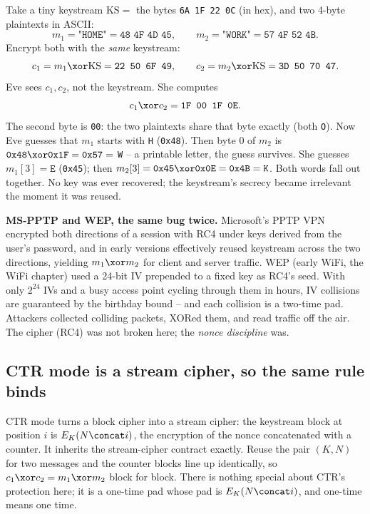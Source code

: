 \begin{example}
\label{ch38:ex-two-time}
Take a tiny keystream $\mathrm{KS} = $ the bytes \texttt{6A 1F 22 0C} (in hex), and two 4-byte plaintexts in ASCII:
\[
m_1 = \texttt{"HOME"}=\texttt{48 4F 4D 45}, \qquad m_2 = \texttt{"WORK"}=\texttt{57 4F 52 4B}.
\]
Encrypt both with the \emph{same} keystream:
\[
c_1 = m_1 \xor \mathrm{KS} = \texttt{22 50 6F 49}, \qquad
c_2 = m_2 \xor \mathrm{KS} = \texttt{3D 50 70 47}.
\]
Eve sees $c_1, c_2$, not the keystream. She computes
\[
c_1 \xor c_2 = \texttt{1F 00 1F 0E}.
\]
The second byte is \texttt{00}: the two plaintexts share that byte exactly (both \texttt{O}). Now Eve guesses that $m_1$ starts with \texttt{H} (\texttt{0x48}). Then byte 0 of $m_2$ is $\texttt{0x48} \xor \texttt{0x1F} = \texttt{0x57} = $ \texttt{W} -- a printable letter, the guess survives. She guesses $m_1[3]=\texttt{E}$ (\texttt{0x45}); then $m_2[3] = \texttt{0x45}\xor\texttt{0x0E}=\texttt{0x4B}=\texttt{K}$. Both words fall out together. No key was ever recovered; the keystream's secrecy became irrelevant the moment it was reused.
\end{example}

\begin{attackbox}
\textbf{MS-PPTP and WEP, the same bug twice.} Microsoft's PPTP VPN encrypted both directions of a session with RC4 under keys derived from the user's password, and in early versions effectively reused keystream across the two directions, yielding $m_1 \xor m_2$ for client and server traffic. WEP (early WiFi, the WiFi chapter) used a 24-bit IV prepended to a fixed key as RC4's seed. With only $2^{24}$ IVs and a busy access point cycling through them in hours, IV collisions are guaranteed by the birthday bound -- and each collision is a two-time pad. Attackers collected colliding packets, XORed them, and read traffic off the air. The cipher (RC4) was not broken here; the \emph{nonce discipline} was.
\end{attackbox}

\subsection{CTR mode is a stream cipher, so the same rule binds}
\label{ch38:ctr-nonce}

CTR mode turns a block cipher into a stream cipher: the keystream block at position $i$ is $E_K(N \concat i)$, the encryption of the nonce concatenated with a counter. It inherits the stream-cipher contract exactly. Reuse the pair $(K, N)$ for two messages and the counter blocks line up identically, so $c_1 \xor c_2 = m_1 \xor m_2$ block for block. There is nothing special about CTR's protection here; it is a one-time pad whose pad is $E_K(N\concat i)$, and one-time means one time.

